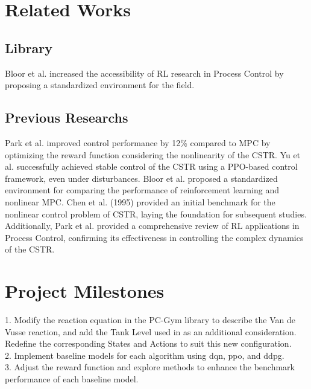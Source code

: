 \documentclass[11pt]{article}
\begin{document}
\section{Related Works}


\subsection{Library}
Bloor et al. increased the accessibility of RL research in Process Control by proposing a standardized environment for the field.\cite{MaximilianB2pcgym}


\subsection{Previous Researchs}
Park et al. improved control performance by 12\% compared to MPC by optimizing the reward function considering the nonlinearity of the CSTR.\cite{Park2024rl} 
Yu et al. successfully achieved stable control of the CSTR using a PPO-based control framework, even under disturbances.\cite{Yu2025ppo}
Bloor et al. proposed a standardized environment for comparing the performance of reinforcement learning and nonlinear MPC.\cite{bloor2024pcgym} 
Chen et al. (1995) provided an initial benchmark for the nonlinear control problem of CSTR, laying the foundation for subsequent studies.\cite{chen1995benchmark}
Additionally, Park et al. provided a comprehensive review of RL applications in Process Control, confirming its effectiveness in controlling the complex dynamics of the CSTR.\cite{Park2025pc}


\section{Project Milestones}
1. Modify the reaction equation in the PC-Gym library to describe the Van de Vusse reaction, and add the Tank Level used in \cite{Yu2025ppo} as an additional consideration. 
Redefine the corresponding States and Actions to suit this new configuration.\\
2. Implement baseline models for each algorithm using \gls{dqn}, \gls{ppo}, and \gls{ddpg}.\\
3. Adjust the reward function and explore methods to enhance the benchmark performance of each baseline model.



\end{document}
